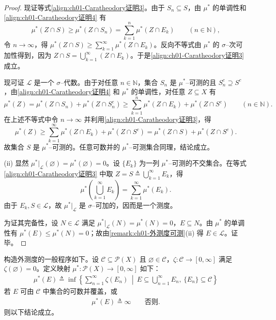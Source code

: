 \documentclass[../../main.tex]{subfiles}%
\begin{document}
\begin{proof}
现证等式\eqref{align:ch01-Caratheodory证明3}。由于 $S_n\subseteq S$，由 $\mu^*$ 的单调性和\eqref{align:ch01-Caratheodory证明4} 有
\[
\mu^*(Z\cap S)\geqslant\mu^*(Z\cap S_n)=\sum_{k=1}^n\mu^*(Z\cap E_k)\qquad(n\in\mathbb{N}),
\]
令 $n\to\infty$，得 $\mu^*(Z\cap S)\geqslant\sum_{k=1}^\infty\mu^*(Z\cap E_k)$。反向不等式由 $\mu^*$ 的 $\sigma$--次可加性得到，因为 $Z\cap S=\bigcup_{k=1}^\infty(Z\cap E_k)$。于是\eqref{align:ch01-Caratheodory证明3} 成立。

现可证 $\mathcal{L}$ 是一个 $\sigma$--代数。由于对任意 $n\in\mathbb{N}$，集合 $S_n$ 是 $\mu^*$--可测的且 $S_n^c\supseteq S^c$，由\eqref{align:ch01-Caratheodory证明4} 和 $\mu^*$ 的单调性，对任意 $Z\subseteq X$ 有
\[
\mu^*(Z)=\mu^*(Z\cap S_n)+\mu^*(Z\cap S_n^c)\geqslant\sum_{k=1}^n\mu^*(Z\cap E_k)+\mu^*(Z\cap S^c)\qquad(n\in\mathbb{N}).
\]
在上述不等式中令 $n\to\infty$ 并利用\eqref{align:ch01-Caratheodory证明3}，得
\[
\mu^*(Z)\geqslant\sum_{k=1}^\infty\mu^*(Z\cap E_k)+\mu^*(Z\cap S^c)=\mu^*(Z\cap S)+\mu^*(Z\cap S^c).
\]
故集合 $S$ 是 $\mu^*$--可测的。任意可数并的 $\mu^*$--可测集合同理，结论成立。

(ii) 显然 $\mu^*|_{\mathcal{L}}(\varnothing )=\mu^*(\varnothing )=0$。设 $\{E_k\}$ 为一列 $\mu^*$--可测的不交集合。在等式\eqref{align:ch01-Caratheodory证明3} 中取 $Z=S\triangleq \bigcup_{k=1}^\infty E_k$，得
\[
\mu^*\left(\bigcup_{k=1}^\infty E_k\right)=\sum_{k=1}^\infty\mu^*(E_k).
\]
由于 $E_k,S\in\mathcal{L}$，故 $\mu^*|_{\mathcal{L}}$ 是 $\sigma$--可加的，因而是一个测度。

为证其完备性，设 $N\in\mathcal{L}$ 满足 $\mu^*|_{\mathcal{L}}(N)=\mu^*(N)=0$，$E\subseteq N$。由 $\mu^*$ 的单调性有 $\mu^*(E)\leqslant\mu^*(N)=0$；故由\cref{remark:ch01-外测度可测}(ii) 得 $E\in\mathcal{L}$。证毕。
\end{proof}

构造外测度的一般程序如下。设 $\mathcal{C}\subseteq\mathcal{P}(X)$ 且 $\varnothing \in\mathcal{C}$，$\zeta:\mathcal{C}\to[0,\infty]$ 满足 $\zeta(\varnothing )=0$。定义映射 $\mu^*:\mathcal{P}(X)\to[0,\infty]$ 如下：
\begin{align}
\mu^*(E)\triangleq \inf\left\{\sum_{n=1}^\infty\zeta(E_n)\ \middle|\ E\subseteq\bigcup_{n=1}^\infty E_n,\ \{E_n\}\subseteq\mathcal{C}\right\} \label{align:ch01-外测度生成a}
\end{align}
若 $E$ 可由 $\mathcal{C}$ 中集合的可数并覆盖，或
\begin{align}
\mu^*(E)\triangleq \infty\qquad\text{否则}. \label{align:ch01-外测度生成b}
\end{align}
则以下结论成立。
\end{document}
